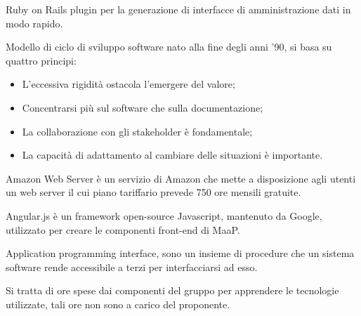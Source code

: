 





\makeFrontPage



\clearpage


\begin{itemize}



Ruby on Rails plugin per la generazione di interfacce di amministrazione dati in modo rapido.


Modello di ciclo di sviluppo software nato alla fine degli anni '90, si basa su quattro principi:
\begin{itemize}
 \item L'eccessiva rigidità ostacola l'emergere del valore;
 \item Concentrarsi più sul software che sulla documentazione;
 \item La collaborazione con gli stakeholder è fondamentale;
 \item La capacità di adattamento al cambiare delle situazioni è importante.
\end{itemize} 




Amazon Web Server è un servizio di Amazon che mette a disposizione agli utenti un web server il cui piano tariffario prevede 750 ore mensili gratuite.


Angular.js è un framework open-source Javascript, mantenuto da Google, utilizzato per creare le componenti front-end di MaaP.


Application programming interface, sono un insieme di procedure che un sistema software rende accessibile a terzi per interfacciarsi ad esso.


Si tratta di ore spese dai componenti del gruppo per apprendere le tecnologie utilizzate, tali ore non sono a carico del proponente.

\end{itemize}


